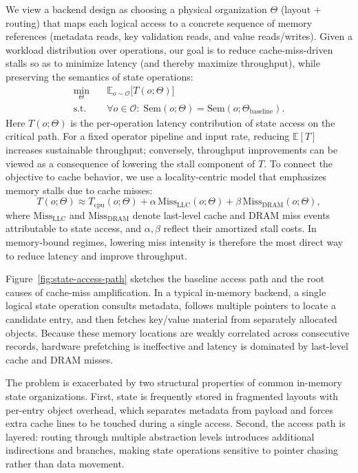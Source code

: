 \documentclass[sigconf]{acmart}
\begin{document}
We view a backend design as choosing a physical organization $\Theta$ (layout + routing) that maps each logical access to a concrete sequence of memory references (metadata reads, key validation reads, and value reads/writes).
Given a workload distribution over operations, our goal is to reduce cache-miss-driven stalls so as to minimize latency (and thereby maximize throughput), while preserving the semantics of state operations:
\begin{align}
\min_{\Theta} \quad & \mathbb{E}_{o\sim \mathcal{O}}\big[ T(o;\Theta) \big] \\[-0.25em]
\text{s.t.}\quad & \forall o\in\mathcal{O}:\; \mathrm{Sem}(o;\Theta)=\mathrm{Sem}(o;\Theta_{\mathrm{baseline}}).
\label{eq:problem}
\end{align}
Here $T(o;\Theta)$ is the per-operation latency contribution of state access on the critical path. For a fixed operator pipeline and input rate, reducing $\mathbb{E}[T]$ increases sustainable throughput; conversely, throughput improvements can be viewed as a consequence of lowering the stall component of $T$.
To connect the objective to cache behavior, we use a locality-centric model that emphasizes memory stalls due to cache misses:
\begin{equation}
T(o;\Theta) \approx T_{\mathrm{cpu}}(o;\Theta) + \alpha\,\mathrm{Miss}_{\mathrm{LLC}}(o;\Theta) + \beta\,\mathrm{Miss}_{\mathrm{DRAM}}(o;\Theta),
\label{eq:stall-model}
\end{equation}
where $\mathrm{Miss}_{\mathrm{LLC}}$ and $\mathrm{Miss}_{\mathrm{DRAM}}$ denote last-level cache and DRAM miss events attributable to state access, and $\alpha,\beta$ reflect their amortized stall costs. In memory-bound regimes, lowering miss intensity is therefore the most direct way to reduce latency and improve throughput.

Figure~\ref{fig:state-access-path} sketches the baseline access path and the root causes of cache-miss amplification.
In a typical in-memory backend, a single logical state operation consults metadata, follows multiple pointers to locate a candidate entry, and then fetches key/value material from separately allocated objects.
Because these memory locations are weakly correlated across consecutive records, hardware prefetching is ineffective and latency is dominated by last-level cache and DRAM misses.

The problem is exacerbated by two structural properties of common in-memory state organizations.
First, state is frequently stored in fragmented layouts with per-entry object overhead, which separates metadata from payload and forces extra cache lines to be touched during a single access.
Second, the access path is layered: routing through multiple abstraction levels introduces additional indirections and branches, making state operations sensitive to pointer chasing rather than data movement.
\end{document}
